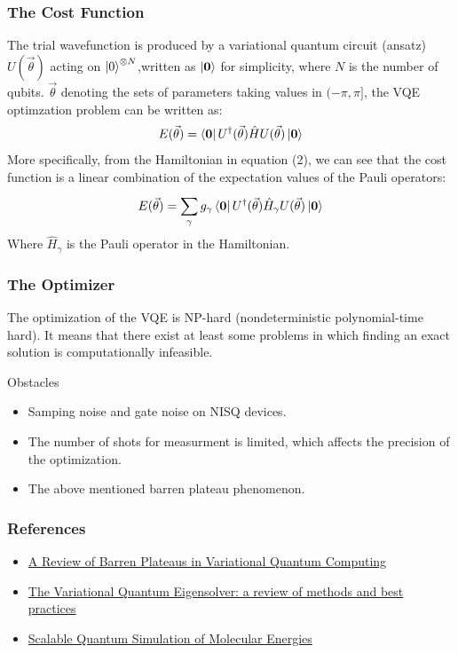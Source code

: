 \documentclass{beamer}
\begin{document}
\begin{frame}
    \frametitle{The Cost Function}
    The trial wavefunction is produced by a variational quantum circuit (ansatz) \(U(\vec{\theta})\) acting on \(\ket{0}^{\otimes N}\),written as \(\ket{\textbf{0}}\) for simplicity, where \(N\) is the number of qubits. \(\vec{\theta}\) denoting the sets of parameters taking values in \((- \pi, \pi]\), the VQE optimzation problem can be written as:
    \begin{equation}
        E(\vec{\theta}) = \bra{\textbf{0}} U^{\dagger}(\vec{\theta}) \hat{H} U(\vec{\theta}) \ket{\textbf{0}}
    \end{equation}
    More specifically, from the Hamiltonian in equation (2), we can see that the cost function is a linear combination of the expectation values of the Pauli operators:
    \begin{equation}
        E(\vec{\theta}) = \sum_{\gamma}^{}g_\gamma \bra{\textbf{0}} U^{\dagger}(\vec{\theta}) \hat{H}_\gamma U(\vec{\theta}) \ket{\textbf{0}}
    \end{equation}
    Where \(\hat{H}_\gamma\) is the Pauli operator in the Hamiltonian.
\end{frame}
\begin{frame}
    \frametitle{The Optimizer}
    The optimization of the VQE is NP-hard (nondeterministic polynomial-time hard). It means that there exist at least some problems in which finding an exact solution is computationally infeasible.
    \begin{alertblock}{Obstacles}
        \begin{itemize}
            \item Samping noise and gate noise on NISQ devices.
            \item The number of shots for measurment is limited, which affects the precision of the optimization.
            \item The above mentioned barren plateau phenomenon.
        \end{itemize}
    \end{alertblock}
\end{frame}
\begin{frame}
    \frametitle{References}
    \begin{itemize}
        \item \href{https://arxiv.org/pdf/2405.00781}{A Review of Barren Plateaus in Variational Quantum Computing}
        \item \href{https://arxiv.org/pdf/2111.05176}{The Variational Quantum Eigensolver: a review of methods and best practices}
        \item \href{https://journals.aps.org/prx/abstract/10.1103/PhysRevX.6.031007}{Scalable Quantum Simulation of Molecular Energies}
    \end{itemize}
\end{frame}
\end{document}
